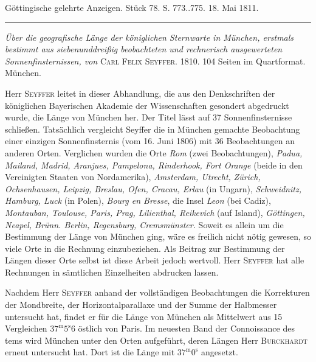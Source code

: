 \hypertarget{native-538Seyffer}{}\label{native-538Seyffer}
\begin{center}\small Göttingische gelehrte Anzeigen. Stück 78. S. 773..775. 18. Mai 1811.\\[3pt]\rule{.72\linewidth}{.3pt}\end{center}

\emph{Über die geografische Länge der königlichen Sternwarte in München, erstmals bestimmt aus siebenunddreißig beobachteten und rechnerisch ausgewerteten Sonnenfinsternissen, von} \textsc{Carl Felix Seyffer}. 1810. 104 Seiten im Quartformat. München.

Herr \textsc{Seyffer} leitet in dieser Abhandlung, die aus den Denkschriften der königlichen Bayerischen Akademie der Wissenschaften gesondert abgedruckt wurde, die Länge von München her. Der Titel lässt auf 37 Sonnenfinsternisse schließen. Tatsächlich vergleicht Seyffer die in München gemachte Beobachtung einer einzigen Sonnenfinsternis (vom 16. Juni 1806) mit 36 Beobachtungen an anderen Orten. Verglichen wurden die Orte \emph{Rom} (zwei Beobachtungen), \emph{Padua, Mailand, Madrid, Aranjues, Pampelona, Rinderhook, Fort Orange} (beide in den Vereinigten Staaten von Nordamerika), \emph{Amsterdam, Utrecht,} \emph{Zürich, Ochsenhausen, Leipzig, Breslau, Ofen, Cracau, Erlau} (in Ungarn), \emph{Schweidnitz, Hamburg, Luck} (in Polen), \emph{Bourg en Bresse}, die Insel \emph{Leon} (bei Cadiz), \emph{Montauban, Toulouse, Paris, Prag, Lilienthal, Reikevich} (auf Island), \emph{Göttingen, Neapel, Brünn. Berlin, Regensburg, Cremsmünster.} Soweit es allein um die Bestimmung der Länge von München ging, wäre es freilich nicht nötig gewesen, so viele Orte in die Rechnung einzubeziehen. Als Beitrag zur Bestimmung der Längen dieser Orte selbst ist diese Arbeit jedoch wertvoll. Herr \textsc{Seyffer} hat alle Rechnungen in sämtlichen Einzelheiten abdrucken lassen.

Nachdem Herr \textsc{Seyffer} anhand der vollständigen Beobachtungen die Korrekturen der Mondbreite, der Horizontalparallaxe und der Summe der Halbmesser untersucht hat, findet er für die Länge von München als Mittelwert aus 15 Vergleichen $37^{\mathrm m}5^{\mathrm s}6$ östlich von Paris. Im neuesten Band der Connoissance des tems wird München unter den Orten aufgeführt, deren Längen Herr \textsc{Burckhardt} erneut untersucht hat. Dort ist die Länge mit $37^{\mathrm m}0^{\mathrm s}$ angesetzt.
